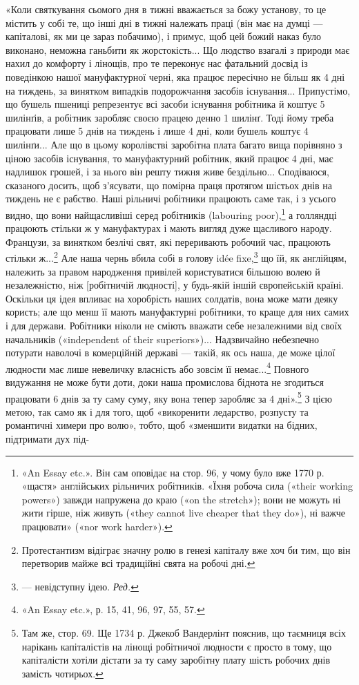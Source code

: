 «Коли святкування сьомого дня в тижні вважається за божу
установу, то це містить у собі те, що інші дні в тижні належать
праці (він має на думці — капіталові, як ми це зараз побачимо),
і примус, щоб цей божий наказ було виконано, неможна ганьбити
як жорстокість... Що людство взагалі з природи має нахил до
комфорту і лінощів, про те переконує нас фатальний досвід із
поведінкою нашої мануфактурної черні, яка працює пересічно
не більш як 4 дні на тиждень, за винятком випадків подорожчання
засобів існування... Припустімо, що бушель пшениці репрезентує
всі засоби існування робітника й коштує 5 шилінґів, а робітник
заробляє своєю працею денно 1 шилінґ. Тоді йому треба працювати
лише 5 днів на тиждень і лише 4 дні, коли бушель коштує
4 шилінґи... Але що в цьому королівстві заробітна плата багато
вища порівняно з ціною засобів існування, то мануфактурний
робітник, який працює 4 дні, має надлишок грошей, і за нього
він решту тижня живе бездільно... Сподіваюся, сказаного досить,
щоб з’ясувати, що помірна праця протягом шістьох днів на тиждень
не є рабство. Наші рільничі робітники працюють саме так,
і з усього видно, що вони найщасливіші серед робітників (labouring
poor),\footnote{
«An Essay etc.». Він сам оповідає на стор. 96, у чому було вже
1770 р. «щастя» англійських рільничих робітників. «Їхня робоча сила
(«their working powers») завжди напружена до краю («on the stretch»);
вони не можуть ні жити гірше, ніж живуть («they cannot live cheaper
that they do»), ні важче працювати» («nor work harder»).
} а голляндці працюють стільки ж у мануфактурах і мають
вигляд дуже щасливого народу. Французи, за винятком безлічі
свят, які переривають робочий час, працюють стільки ж...\footnote{
Протестантизм відіграє значну ролю в генезі капіталу вже хоч
би тим, що він перетворив майже всі традиційні свята на робочі дні.
}
Але наша чернь вбила собі в голову idée fixe,\footnote*{
— невідступну ідею. \emph{Ред.}
} що їй, як англійцям,
належить за правом народження привілей користуватися більшою
волею й незалежністю, ніж [робітничій людності], у будь-якій
іншій європейській країні. Оскільки ця ідея впливає на
хоробрість наших солдатів, вона може мати деяку користь; але
що менш її мають мануфактурні робітники, то краще для них
самих і для держави. Робітники ніколи не сміють вважати себе
незалежними від своїх начальників («independent of their superiors»)...
Надзвичайно небезпечно потурати наволочі в комерційній
державі — такій, як ось наша, де може  цілої людности
має лише невеличку власність або зовсім її немає...\footnote{
«An Essay etc.», р. 15, 41, 96, 97, 55, 57.
} Повного
видужання не може бути доти, доки наша промислова біднота не
згодиться працювати 6 днів за ту саму суму, яку вона тепер заробляє
за 4 дні».\footnote{
Там же, стор. 69. Ще 1734 р. Джекоб Вандерлінт пояснив, що таємниця
всіх нарікань капіталістів на лінощі робітничої людности є просто
в тому, що капіталісти хотіли дістати за ту саму заробітну плату шість
робочих днів замість чотирьох.
} З цією метою, так само як і для того, щоб
«викоренити ледарство, розпусту та романтичні химери про волю»,
тобто, щоб «зменшити видатки на бідних, підтримати дух під-